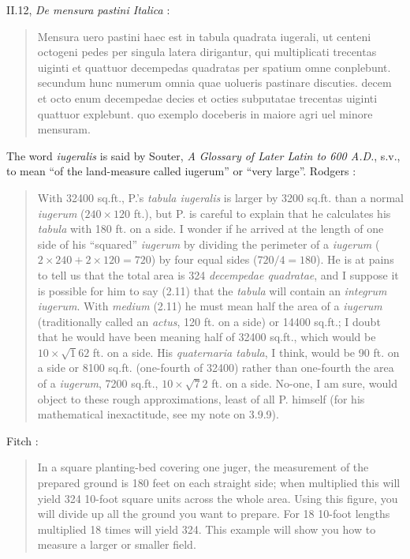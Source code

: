 \documentclass{article}
\theoremstyle{definition}
\begin{document}
II.12, {\em De mensura pastini Italica} \cite[p.~55]{palladii}:

\begin{quote}
Mensura uero pastini haec est in tabula quadrata iugerali,
ut centeni octogeni pedes per singula latera dirigantur,
qui multiplicati trecentas uiginti et quattuor decempedas
quadratas per spatium omne conplebunt.
secundum hunc numerum omnia quae uolueris pastinare discuties.
decem et octo enum decempedae decies et octies subputatae
trecentas uiginti quattuor explebunt.
quo exemplo doceberis in maiore agri uel minore mensuram. 
\end{quote}

The word {\em iugeralis} is said by Souter, {\em A Glossary of Later Latin to 600 A.D.}, s.v., to mean ``of the land-measure called iugerum'' or ``very large''. 
Rodgers \cite[p.~96]{palladius}:

\begin{quote}
With 32400 sq.ft., P.'s {\em tabula iugeralis} is larger by 3200 sq.ft. than a normal {\em iugerum} ($240 \times 120$ ft.),
but P. is careful to explain that he calculates his {\em tabula} with 180 ft. on a side. I wonder if he arrived at the length of one side
of his ``squared'' {\em iugerum} by dividing the perimeter of a {\em iugerum} ($2 \times 240+2 \times 120=720$) by four equal
sides ($720/4=180$). He is at pains to tell us that the total area is 324 {\em decempedae quadratae}, and I suppose  it is
possible for him to say (2.11) that the {\em tabula} will contain an {\em integrum iugerum}. With {\em medium} (2.11) he must mean
half the area of a {\em iugerum} (traditionally called an {\em actus}, 120 ft. on a side) or 14400 sq.ft.; I doubt that he would
have been meaning half of 32400 sq.ft., which would be $10 \times \surd 162$ ft. on a side. His {\em quaternaria tabula}, I think,
would be 90 ft. on a side or 8100 sq.ft. (one-fourth of 32400) rather than one-fourth the area of a {\em iugerum}, 7200 sq.ft.,
$10 \times \surd 72$ ft. on a side. No-one, I am sure, would object to these rough approximations, least of all P. himself (for his mathematical inexactitude, see my note
on 3.9.9).
\end{quote}

Fitch \cite[p.~75]{fitch}:

\begin{quote}
In a square planting-bed covering one juger, the measurement of the prepared ground is 180 feet on each straight side; when multiplied this will yield 324 10-foot square units across the whole area. Using this figure, you will divide up all the ground you want to prepare. For 18 10-foot lengths multiplied 18 times will yield 324.
This example will show you how to measure a larger or smaller field.
\end{quote}
\end{document}
